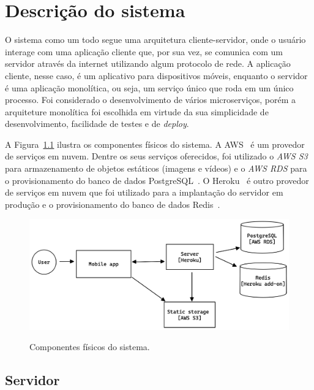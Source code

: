 \chapter{Descrição do sistema}

O sistema como um todo segue uma arquitetura cliente-servidor, onde o usuário interage com uma aplicação cliente que, por sua vez, se comunica com um servidor através da internet utilizando algum protocolo de rede. A aplicação cliente, nesse caso, é um aplicativo para dispositivos móveis, enquanto o servidor é uma aplicação monolítica, ou seja, um serviço único que roda em um único processo. Foi considerado o desenvolvimento de vários microserviços, porém a arquiteture monolítica foi escolhida em virtude da sua simplicidade de desenvolvimento, facilidade de testes e de \emph{deploy}. 

A Figura~\ref{f.system} ilustra os componentes físicos do sistema. A AWS~\cite{aws} é um provedor de serviços em nuvem. Dentre os seus serviços oferecidos, foi utilizado o \emph{AWS S3} para armazenamento de objetos estáticos (imagens e vídeos) e o \emph{AWS RDS} para o provisionamento do banco de dados PostgreSQL~\cite{postgresql}. O Heroku~\cite{heroku} é outro provedor de serviços em nuvem que foi utilizado para a implantação do servidor em produção e o provisionamento do banco de dados Redis~\cite{redis}.

\begin{figure}[htbp]
	\caption{\small Componentes físicos do sistema.}
	\centering
	\includegraphics[width=\textwidth]{../diagrams/out/system.png}
	\label{f.system}
\end{figure}

\FloatBarrier

\section{Servidor}

